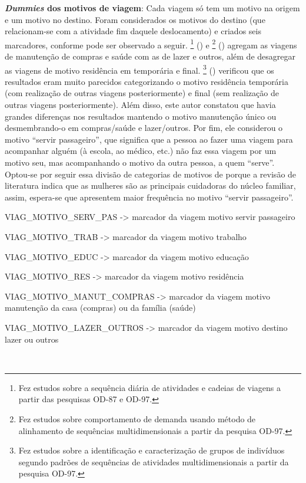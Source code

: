 \begin{compactitem}
\item \textbf{\textit{Dummies} dos motivos de viagem}: Cada viagem só tem um motivo na origem e um motivo no destino.
Foram considerados os motivos do destino (que relacionam-se com a atividade fim daquele deslocamento) e criados seis marcadores, conforme pode ser observado a seguir. 
\footnote{Fez estudos sobre a sequência diária de atividades e cadeias de viagens a partir das pesquisas OD-87 e OD-97.} (\citeyear{VESPUCCI2003}) e \footnote{Fez estudos sobre comportamento de demanda usando método de alinhamento de sequências multidimensionais a partir da pesquisa OD-97.} (\citeyear{GERMANI2005}) agregam as viagens de manutenção de compras e saúde com as de lazer e outros, além de desagregar as viagens de motivo residência em temporária e final. 
\footnote{Fez estudos sobre a identificação e caracterização de grupos de indivíduos segundo padrões de sequências de atividades multidimensionais a partir da pesquisa OD-97.} (\citeyear{DALMASO2009}) verificou que os resultados eram muito parecidos categorizando o motivo residência temporária (com realização de outras viagens posteriormente) e final (sem realização de outras viagens posteriormente).
Além disso, este autor constatou que havia grandes diferenças nos resultados mantendo o motivo manutenção único ou desmembrando-o em compras/saúde e lazer/outros.
Por fim, ele considerou o motivo ``servir passageiro'', que significa que a pessoa ao fazer uma viagem para acompanhar alguém (à escola, ao médico, etc.) não faz essa viagem por um motivo seu, mas acompanhando o motivo da outra pessoa, a quem ``serve''. Optou-se por seguir essa divisão de categorias de motivos de  porque a revisão de literatura indica que as mulheres são as principais cuidadoras do núcleo familiar, assim, espera-se que apresentem maior frequência no motivo ``servir passageiro''.
    \begin{compactitem}[]
    \item VIAG_MOTIVO_SERV_PAS -> marcador da viagem motivo servir passageiro
    \item VIAG_MOTIVO_TRAB -> marcador da viagem motivo trabalho
    \item VIAG_MOTIVO_EDUC -> marcador da viagem motivo educação
    \item VIAG_MOTIVO_RES -> marcador da viagem motivo residência
    \item VIAG_MOTIVO_MANUT_COMPRAS -> marcador da viagem motivo manutenção da casa (compras) ou da família (saúde)
    \item VIAG_MOTIVO_LAZER_OUTROS -> marcador da viagem motivo destino lazer ou outros
    \end{compactitem}\


\end{compactitem}

